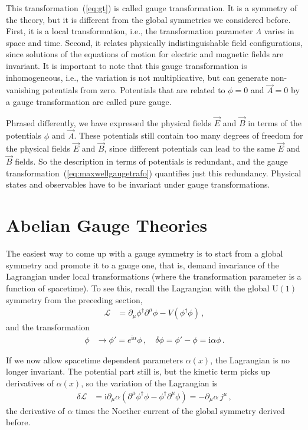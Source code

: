 \documentclass[12pt]{report}
\renewcommand{\L}{\ensuremath{\mathscr{L}}}
\renewcommand{\i}{\ensuremath{\text{i}}}
\newcommand{\2}{\ensuremath{\sqrt{2}\,}}
\renewcommand{\L}{\ensuremath{\mathscr{L}}}
\begin{document}
{      This transformation~(\ref{eq:gt}) is called gauge transformation.
       It is a symmetry of the theory, but it
      is different from the global symmetries we considered before. First, it is a local
      transformation, i.e., the transformation parameter $\Lambda$ varies in space and
      time. Second, it relates physically indistinguishable field configurations, since solutions 
      of the equations of motion for electric and magnetic fields are
      invariant. It is important to note that this gauge transformation is inhomogeneous, i.e.,
      the variation is not multiplicative, but can generate non-vanishing potentials from zero.
      Potentials that are related to $\phi=0$ and $\vec{A}=0$ by a gauge
      transformation are called pure gauge.
      
      Phrased differently, we have expressed the physical fields $\vec{E}$ and $\vec{B}$ in terms 
      of the potentials $\phi$ and $\vec{A}$. These potentials still contain too many degrees of
      freedom for the
      physical fields $\vec{E}$ and $\vec{B}$, since different potentials can lead to the
      same  $\vec{E}$ and $\vec{B}$ fields. So the description in terms of potentials is
      redundant, and the gauge transformation~(\ref{eq:maxwellgaugetrafo}) quantifies just
      this redundancy. Physical states and observables have to be
      invariant under gauge transformations. 
      

    \section{Abelian Gauge Theories}
      The easiest way to come up with a gauge symmetry is to start from a global symmetry and promote
      it to a gauge one, that is, demand invariance of the Lagrangian under local
      transformations (where the transformation parameter is a function of spacetime). To see
      this, recall the Lagrangian with the global $\mathrm{U(1)}$ symmetry from the preceding
      section, 
      \begin{align*}
        \L&=\partial_\mu \phi^\dagger \partial^\mu\phi - V(\phi^\dagger\phi)\,,
      \end{align*}
      and the transformation
      \begin{align*}
        \phi&\to\phi' = e^{\i\alpha} \phi\,,\quad \delta\phi = \phi'-\phi = \i \alpha \phi\,.
      \end{align*}
      
      If we now allow spacetime dependent parameters $\alpha(x)$, the Lagrangian is no longer
      invariant. The potential part still is, but the kinetic term picks up derivatives of
      $\alpha(x)$, so the variation of the Lagrangian is
      \begin{align}
        \delta \L&= \i \partial_\mu \alpha \left(\partial^\mu\phi^\dagger \phi -\phi^\dagger
          \partial^\mu \phi\right) = -\partial_\mu\alpha \,j^\mu\,,
      \end{align}
      the derivative of $\alpha$ times the Noether current of the global symmetry derived
      before. 

}
\end{document}
